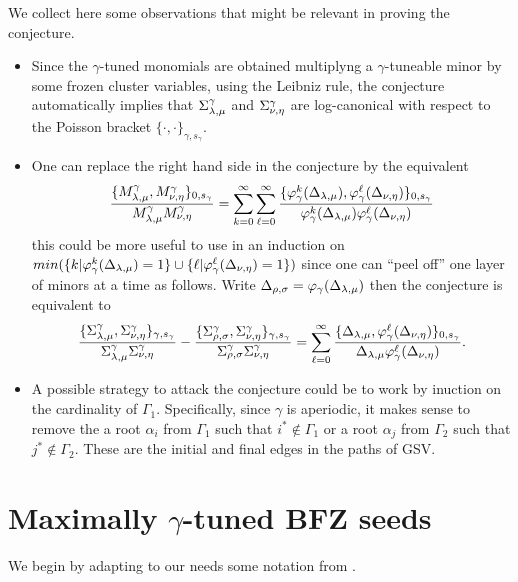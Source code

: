 \documentclass[a4paper]{amsart}
\theoremstyle{definition}
\newcommand{\sayS}[1]{\say[S]{#1}}
\begin{document}
We collect here some observations that might be relevant in proving the conjecture.
\begin{itemize}
  \item
    Since the $\gamma$-tuned monomials are obtained multiplyng a $\gamma$-tuneable minor by some frozen cluster variables, using the Leibniz rule, the conjecture automatically implies that $\function[\lambda][\mu]$ and $\function[\nu][\eta]$ are log-canonical with respect to the Poisson bracket $\{\cdot,\cdot\}_{\gamma,s_\gamma}$.

 \item
   One can replace the right hand side in the conjecture by the equivalent
   \[
     \frac{\{\monomial[\lambda][\mu],\monomial[\nu][\eta]\}_{0,s_\gamma}}{\monomial[\lambda][\mu] \monomial[\nu][\eta]}
     =
     \sum_{k=0}^\infty\sum_{\ell=0}^\infty \frac{\{\varphi_\gamma^k(\minor[\lambda][\mu]),\varphi_\gamma^\ell(\minor[\nu][\eta])\}_{0,s_\gamma}}{\varphi_\gamma^k(\minor[\lambda][\mu])\varphi_\gamma^\ell(\minor[\nu][\eta])}
   \]
   this could be more useful to use in an induction on $min(\{k | \varphi_\gamma^k(\minor[\lambda][\mu])=1\}\cup \{\ell | \varphi_\gamma^\ell(\minor[\nu][\eta])=1\} )$ since one can ``peel off'' one layer of minors at a time as follows.
   Write $\minor[\rho][\sigma] = \varphi_\gamma(\minor[\lambda][\mu])$ then the conjecture is equivalent to
   \[
     \frac{\{\function[\lambda][\mu],\function[\nu][\eta]\}_{\gamma,s_\gamma}}{\function[\lambda][\mu] \function[\nu][\eta]}
     -
     \frac{\{\function[\rho][\sigma],\function[\nu][\eta]\}_{\gamma,s_\gamma}}{\function[\rho][\sigma] \function[\nu][\eta]}
     =
     \sum_{\ell=0}^\infty \frac{\{\minor[\lambda][\mu],\varphi_\gamma^\ell(\minor[\nu][\eta])\}_{0,s_\gamma}}{\minor[\lambda][\mu]\varphi_\gamma^\ell(\minor[\nu][\eta])}
     .
   \]

 \item
   A possible strategy to attack the conjecture could be to work by inuction on the cardinality of $\Gamma_1$. 
   Specifically, since $\gamma$ is aperiodic, it makes sense to remove the a root $\alpha_i$ from $\Gamma_1$ such that $i^*\not \in \Gamma_1$ or a root $\alpha_j$ from $\Gamma_2$ such that $j^*\not \in \Gamma_2$.
   These are the initial and final edges in the paths of GSV.
   \sayS{Is this right?} 

\end{itemize}

\section{Maximally $\gamma$-tuned BFZ seeds}
We begin by adapting to our needs some notation from \cite{BFZ05}.
\end{document}
